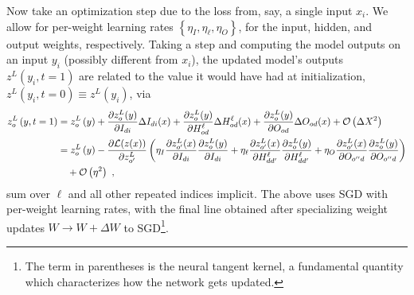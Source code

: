 Now take an optimization step due to the loss from, say, a single input $ x_{ i } $. We allow for
per-weight learning rates $ \left \{ \eta_{ I }, \eta_{ \ell }, \eta_{ O } \right \} $, for the
input, hidden, and output weights, respectively.  Taking a step and computing the model outputs on
an input $ y_{ i } $ (possibly different from $ x_{ i } $), the updated model's outputs $ z^{ L
}\left ( y_{ i }, t=1 \right ) $ are related to the value it would have had at
initialization, $ z^{ L }\left ( y_{ i }, t=0 \right )\equiv z^{ L }\left ( y_{ i } \right ) $, via
\begin{align}
    z^{ L }_{ o }\left ( y, t=1 \right ) &=  z^{ L }_{ o }\left ( y \right )
    + \frac{ \partial z^{ L }_{ o }(y) }{ \partial I_{ di } } \Delta I_{ di }(x)
    + \frac{ \partial z^{ L }_{ o }(y) }{ \partial H^{ \ell }_{ od } } \Delta H^{ \ell }_{ od }(x)
    + \frac{ \partial z^{ L }_{ o }(y) }{ \partial O_{ od } } \Delta O_{ od }(x)+\mathcal{O} \left( \Delta X^{ 2 } \right) \nonumber\\
   &=  z^{ L }_{ o }\left ( y \right )
    - \frac{ \partial \mathcal{L}(z(x)) }{\partial z ^{ L }_{ o' }  }\left( \eta_{ I } \frac{ \partial z ^{ L }_{ o' }(x) }{ \partial I_{ di } }\frac{ \partial z^{ L }_{ o }(y) }{ \partial I_{ di } }
    + \eta_{ \ell }\frac{ \partial z ^{ L }_{ o' }(x) }{ \partial H^{ \ell }_{ dd' } }\frac{ \partial z^{ L }_{ o }(y) }{ \partial H^{ \ell }_{ dd' } }
    + \eta_{ O }\frac{ \partial z ^{ L }_{ o' }(x) }{ \partial O_{ o''d } }\frac{ \partial z^{ L }_{ o }(y) }{ \partial O_{ o''d  } } \right ) \nonumber\\
    & \quad+\mathcal{O} \left( \eta^{ 2 } \right)  \ ,
    \label{app_eq_general_output_update}
\end{align}
sum over $ \ell $ and all other repeated indices implicit. The above uses SGD with per-weight
learning rates, with the final line obtained after specializing weight updates $ W
\longrightarrow W + \Delta W $ to SGD\footnote{The term in parentheses is the neural tangent kernel,
a fundamental quantity which characterizes how the network gets updated.}.

